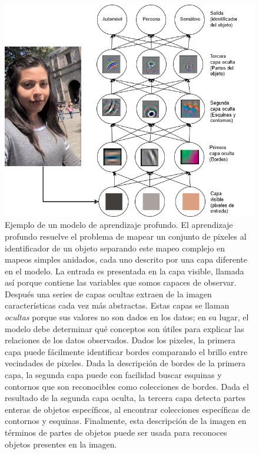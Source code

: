 \begin{figure}
    \centering
    \includegraphics[scale=0.5]{figures/deep_learning_person.png}
    \caption{Ejemplo de un modelo de aprendizaje profundo. El aprendizaje profundo resuelve el problema de mapear un conjunto de pixeles al identificador de un objeto separando este mapeo
    complejo en mapeos simples anidados, cada uno descrito por
    una capa diferente en el modelo. La entrada es presentada
    en la capa visible, llamada así porque contiene las variables que somos capaces de observar. Después una series de capas ocultas extraen de la imagen características cada vez más
    abstractas. Estas capas se llaman \textit{ocultas} porque
    sus valores no son dados en los datos; en su lugar, el modelo
    debe determinar qué conceptos son útiles para explicar 
    las relaciones de los datos observados. Dados los pixeles,
    la primera capa puede fácilmente identificar bordes comparando
    el brillo entre vecindades de pixeles.
    Dada la descripción de bordes de la primera capa, la segunda
    capa puede con facilidad buscar esquinas y contornos
    que son reconocibles como colecciones de bordes. Dada el 
    resultado de la segunda capa oculta, la tercera capa detecta
    partes enteras de objetos específicos, al encontrar
    colecciones específicas de contornos y esquinas. 
    Finalmente, esta descripción de la imagen en términos 
    de partes de objetos puede ser usada para reconoces objetos
    presentes en la imagen.\label{fig:deeplearning_person}}
    
\end{figure}
